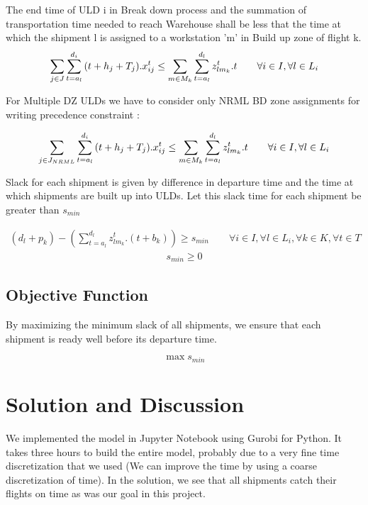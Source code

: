 \documentclass[11pt,a4paper,fleqn]{article}
\begin{document}
The end time of ULD i in Break down process and the summation of transportation time needed to reach Warehouse shall be less that the time at which the shipment l is assigned to a workstation 'm' in Build up zone of flight k.
\begin{align}
 \sum_{j \in J}\sum_{t=a_{l}}^{d_{i}}{\color{black}{(t + h_{j} + T_{j})}} . x_{ij}^t  \le \sum_{m \in M_{k}}\sum_{t=a_{l}}^{d_{l}}z_{lm_{k}}^t . t \qquad \forall i \in I , \forall l \in L_{i}
\end{align}

For Multiple DZ ULDs we have to consider only NRML BD zone assignments for writing precedence constraint : 

\begin{align}
 \sum_{j \in J_{NRML}}\sum_{t=a_{l}}^{d_{i}}{\color{black}{(t + h_{j} + T_{j})}} . x_{ij}^t  \le \sum_{m \in M_{k}}\sum_{t=a_{l}}^{d_{l}}z_{lm_{k}}^t . t \qquad \forall i \in I , \forall l \in L_{i}
\end{align}

Slack for each shipment is given by difference in departure time and the time at which shipments are built up into ULDs. Let this slack time for each shipment be greater than ${s_{min}}$

\begin{align}
 ( d_{l} + p_{k}) - (\sum_{t=a_{l}}^{d_{l}}z_{lm_{k}}^t .(t + b_{k}) )  \ge s_{min} \qquad \forall i \in I, \forall l \in L_{i}, \forall k \in K, \forall t \in T
\end{align}
\begin{align}
s_{min} \ge 0
\end{align}

\subsection{Objective Function}
\label{sec:objBUZone}

By maximizing the minimum slack of all shipments, we ensure that each shipment is ready well before its departure time.

\begin{equation*}
\max s_{min}
\end{equation*}


\section{Solution and Discussion}
\label{sec:modeloutput}

We implemented the model in Jupyter Notebook using Gurobi for Python. It takes three hours to build the entire model, probably due to a very fine time discretization that we used (We can improve the time by using a coarse discretization of time). In the solution, we see that all shipments catch their flights on time as was our goal in this project. 
\end{document}
